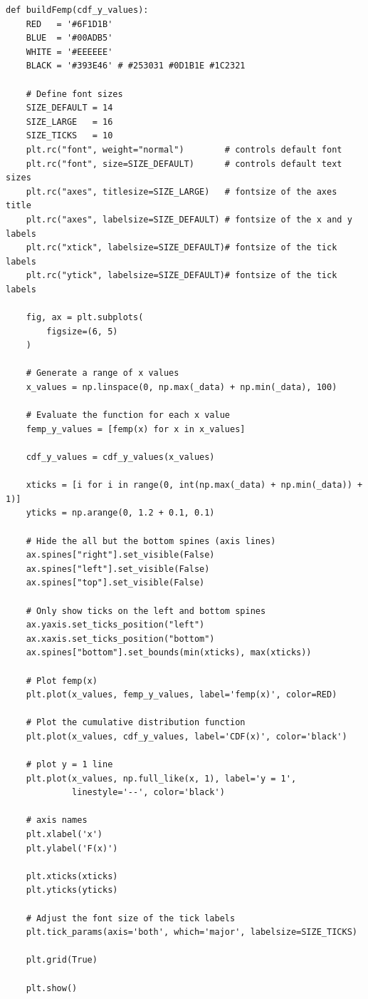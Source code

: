 \documentclass[a4paper, 14pt]{extarticle}
\begin{document}
\begin{lstlisting}[caption={функция построения совмещенных femp(x)}, label={lst:15}]
def buildFemp(cdf_y_values):
    RED   = '#6F1D1B'
    BLUE  = '#00ADB5'
    WHITE = '#EEEEEE'
    BLACK = '#393E46' # #253031 #0D1B1E #1C2321

    # Define font sizes
    SIZE_DEFAULT = 14
    SIZE_LARGE   = 16
    SIZE_TICKS   = 10
    plt.rc("font", weight="normal")        # controls default font
    plt.rc("font", size=SIZE_DEFAULT)      # controls default text sizes
    plt.rc("axes", titlesize=SIZE_LARGE)   # fontsize of the axes title
    plt.rc("axes", labelsize=SIZE_DEFAULT) # fontsize of the x and y labels
    plt.rc("xtick", labelsize=SIZE_DEFAULT)# fontsize of the tick labels
    plt.rc("ytick", labelsize=SIZE_DEFAULT)# fontsize of the tick labels

    fig, ax = plt.subplots(
        figsize=(6, 5)
    )

    # Generate a range of x values
    x_values = np.linspace(0, np.max(_data) + np.min(_data), 100)

    # Evaluate the function for each x value
    femp_y_values = [femp(x) for x in x_values]

    cdf_y_values = cdf_y_values(x_values)

    xticks = [i for i in range(0, int(np.max(_data) + np.min(_data)) + 1)]
    yticks = np.arange(0, 1.2 + 0.1, 0.1)

    # Hide the all but the bottom spines (axis lines)
    ax.spines["right"].set_visible(False)
    ax.spines["left"].set_visible(False)
    ax.spines["top"].set_visible(False)

    # Only show ticks on the left and bottom spines
    ax.yaxis.set_ticks_position("left")
    ax.xaxis.set_ticks_position("bottom")
    ax.spines["bottom"].set_bounds(min(xticks), max(xticks))

    # Plot femp(x)
    plt.plot(x_values, femp_y_values, label='femp(x)', color=RED)

    # Plot the cumulative distribution function
    plt.plot(x_values, cdf_y_values, label='CDF(x)', color='black')

    # plot y = 1 line
    plt.plot(x_values, np.full_like(x, 1), label='y = 1', 
             linestyle='--', color='black')

    # axis names
    plt.xlabel('x')
    plt.ylabel('F(x)')

    plt.xticks(xticks)
    plt.yticks(yticks)

    # Adjust the font size of the tick labels
    plt.tick_params(axis='both', which='major', labelsize=SIZE_TICKS)

    plt.grid(True)

    plt.show()
\end{lstlisting}
\end{document}
